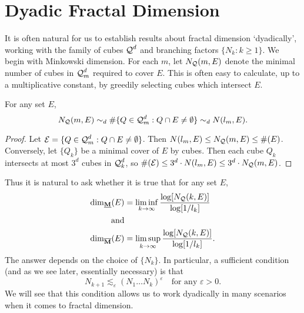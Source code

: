 \section{Dyadic Fractal Dimension}

It is often natural for us to establish results about fractal dimension `dyadically', working with the family of cubes $\operatorname{\mathcal{Q}}^d$ and branching factors $\{ N_k : k \geq 1 \}$. We begin with Minkowski dimension. For each $m$, let $N_{\operatorname{\mathcal{Q}}}(m,E)$ denote the minimal number of cubes in $\operatorname{\mathcal{Q}}_m^d$ required to cover $E$. This is often easy to calculate, up to a multiplicative constant, by greedily selecting cubes which intersect $E$.

\begin{lemma} \label{comparableCovers}
	For any set $E$,
	\[ N_{\operatorname{\mathcal{Q}}}(m,E) \sim_d \# \{ Q \in \operatorname{\mathcal{Q}}_m^d : Q \cap E \neq \emptyset \} \sim_d N(l_m,E). \]
\end{lemma}
\begin{proof}
	Let $\mathcal{E} = \{ Q \in \operatorname{\mathcal{Q}}_m^d : Q \cap E \neq \emptyset \}$. Then $N(l_m,E) \leq N_{\operatorname{\mathcal{Q}}}(m,E) \leq \#(E)$. Conversely, let $\{ Q_k \}$ be a minimal cover of $E$ by cubes. Then each cube $Q_k$ intersects at most $3^d$ cubes in $\operatorname{\mathcal{Q}}_k^d$, so $\#(\mathcal{E}) \leq 3^d \cdot N(l_m,E) \leq 3^d \cdot N_{\operatorname{\mathcal{Q}}}(m,E)$.
\end{proof}

Thus it is natural to ask whether it is true that for any set $E$,
%
\begin{equation} \label{definingSequence}
	\begin{aligned}
		\operatorname{\dim_{\underline{\mathbf{M}}}}(E) &= \liminf_{k \to \infty} \frac{\log[N_{\operatorname{\mathcal{Q}}}(k,E)]}{\log[1/l_k]}\\
		\text{and}\\
		\operatorname{\dim_{\overline{\mathbf{M}}}}(E) &= \limsup_{k \to \infty} \frac{\log[N_{\operatorname{\mathcal{Q}}}(k,E)]}{\log[1/l_k]}.
	\end{aligned}
\end{equation}
%
The answer depends on the choice of $\{ N_k \}$. In particular, a sufficient condition (and as we see later, essentially necessary) is that
%
\begin{equation} \label{definingsequencegrowthrate}
	N_{k+1} \lesssim_\varepsilon (N_1 \dots N_k)^\varepsilon \quad \text{for any $\varepsilon > 0$}.
\end{equation}
%
We will see that this condition allows us to work dyadically in many scenarios when it comes to fractal dimension.

%
%

